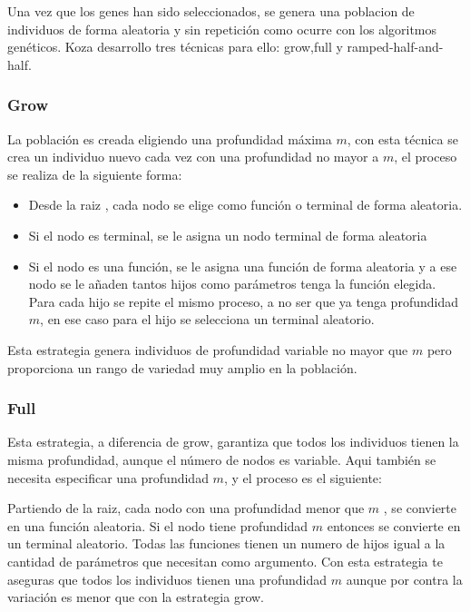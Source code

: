\documentclass[12pt]{article} \usepackage[utf8x]{inputenc}
\begin{document}
Una vez que los genes han sido seleccionados, se genera una poblacion de individuos de forma aleatoria y sin repetición como ocurre con los algoritmos genéticos. Koza desarrollo tres técnicas para ello: grow,full y ramped-half-and-half.

\subsubsection{Grow}

La población es creada eligiendo una profundidad máxima \(m\), con esta técnica se crea un individuo nuevo cada vez con una profundidad no mayor a \(m\), el proceso se realiza de la siguiente forma:
\begin{itemize}
\item  Desde la raiz , cada nodo se elige como función o terminal de forma aleatoria.
\item  Si el nodo es terminal, se le asigna un nodo terminal de forma aleatoria
\item  Si el nodo es una función, se le asigna una función de forma aleatoria y a ese nodo se le añaden tantos hijos como parámetros tenga la función elegida. Para cada hijo se repite el mismo proceso, a no ser que ya tenga profundidad \(m\), en ese caso para el hijo se selecciona un terminal aleatorio.
\end{itemize}

Esta estrategia genera individuos de profundidad variable no mayor que \(m\) pero proporciona un rango de variedad muy amplio en la población.

\subsubsection{Full}

Esta estrategia, a diferencia de grow, garantiza que todos los individuos tienen la misma profundidad, aunque el número de nodos es variable. Aqui también se necesita especificar una profundidad \(m\), y el proceso es el siguiente:

 Partiendo de la raiz, cada nodo con una profundidad menor que \(m\) , se convierte en una función aleatoria. Si el nodo tiene profundidad \(m\) entonces se convierte en un terminal aleatorio. 
 Todas las funciones tienen un numero de hijos igual a la cantidad de parámetros que necesitan como argumento. Con esta estrategia te aseguras que todos los individuos tienen una profundidad \(m\) aunque por contra la variación es menor que con la estrategia grow.\\
 
\end{document}
